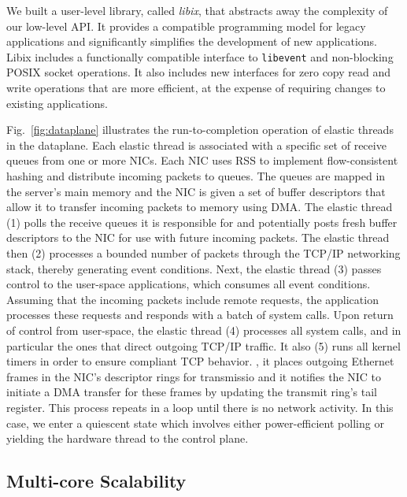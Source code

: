 We built a user-level library, called \emph{libix}, that abstracts away
the complexity of our low-level API. It provides a compatible programming
model for legacy applications and significantly simplifies the
development of new applications. Libix includes a functionally
compatible interface to \texttt{libevent} and non-blocking POSIX
socket operations. It also includes new interfaces for zero copy read
and write operations that are more efficient, at the expense of
requiring changes to existing applications. 


% 

Fig.~\ref{fig:dataplane} illustrates the run-to-completion
operation of elastic threads in the \ix dataplane. Each elastic thread
is associated with a specific set of receive queues from one or more
NICs. Each NIC uses RSS to implement flow-consistent hashing and
distribute incoming packets to queues. The queues are mapped in the
server's main memory and the NIC is given a set of buffer descriptors
that allow it to transfer incoming packets to memory using DMA\@.  The
elastic thread (1) polls the receive queues it is responsible for and
potentially posts fresh buffer descriptors to the NIC for use with
future incoming packets. The elastic thread then (2) processes a bounded
number of packets through the TCP/IP networking stack, thereby
generating event conditions. Next, the elastic thread (3) passes
control to the user-space applications, which consumes all event
conditions. Assuming that the incoming packets include remote
requests, the application processes these requests and responds with a
batch of system calls. Upon return of control from user-space, the
elastic thread (4) processes all system calls, and in particular the
ones that direct outgoing TCP/IP traffic. It also (5) runs all kernel
timers in order to ensure compliant TCP behavior. , it places
outgoing Ethernet frames in the NIC's descriptor rings for
transmissio and it notifies the NIC to initiate a DMA transfer
for these frames by updating the transmit ring's tail register.  This
process repeats in a loop until there is no network activity. In this
case, we enter a quiescent state which involves either power-efficient
polling or yielding the hardware thread  to the control plane.



\subsection{Multi-core Scalability}
\label{sec:impl:cohfree}

